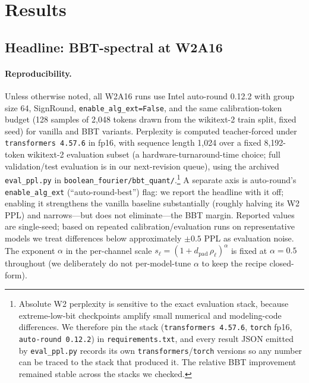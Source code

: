 \documentclass[11pt]{article}
\begin{document}
\section{Results}

\subsection{Headline: BBT-spectral at W2A16}

\paragraph{Reproducibility.}
Unless otherwise noted, all W2A16 runs use Intel auto-round 0.12.2 with group size 64, SignRound, \texttt{enable\_alg\_ext=False}, and the same calibration-token budget (128 samples of 2{,}048 tokens drawn from the wikitext-2 train split, fixed seed) for vanilla and BBT variants. Perplexity is computed teacher-forced under \texttt{transformers 4.57.6} in fp16, with sequence length 1{,}024 over a fixed 8{,}192-token wikitext-2 evaluation subset (a hardware-turnaround-time choice; full validation/test evaluation is in our next-revision queue), using the archived \texttt{eval\_ppl.py} in \texttt{boolean\_fourier/bbt\_quant/}.\footnote{Absolute W2 perplexity is sensitive to the exact evaluation stack, because extreme-low-bit checkpoints amplify small numerical and modeling-code differences. We therefore pin the stack (\texttt{transformers 4.57.6}, \texttt{torch} fp16, \texttt{auto-round 0.12.2}) in \texttt{requirements.txt}, and every result JSON emitted by \texttt{eval\_ppl.py} records its own \texttt{transformers}/\texttt{torch} versions so any number can be traced to the stack that produced it. The relative BBT improvement remained stable across the stacks we checked.} A separate axis is auto-round's \texttt{enable\_alg\_ext} (``auto-round-best'') flag: we report the headline with it off; enabling it strengthens the vanilla baseline substantially (roughly halving its W2 PPL) and narrows---but does not eliminate---the BBT margin. Reported values are single-seed; based on repeated calibration/evaluation runs on representative models we treat differences below approximately $\pm 0.5$ PPL as evaluation noise. The exponent $\alpha$ in the per-channel scale $s_\ell = (1 + d_{\text{pad}}\, \rho_\ell)^\alpha$ is fixed at $\alpha = 0.5$ throughout (we deliberately do not per-model-tune $\alpha$ to keep the recipe closed-form).
\end{document}

